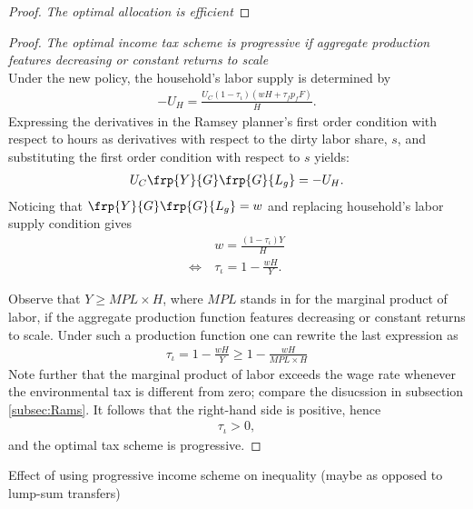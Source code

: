 \begin{proof}\textit{The optimal allocation is efficient}
\end{proof}

\begin{proof} \textit{The optimal income tax scheme is progressive if aggregate production features decreasing or constant returns to scale}\\
Under the new policy, the household's labor supply is determined by
\begin{align}
-U_H=\frac{U_C (1-\tau_{\iota})(wH+\tau_f p_fF)}{H}.
\end{align}
Expressing the derivatives in the Ramsey planner's first order condition with respect to hours as derivatives with respect to the dirty labor share, $s$, and substituting the first order condition with respect to $s$ yields:
\begin{align}
U_C \frp{Y}{G}\frp{G}{L_g}=-U_H.
\end{align}
Noticing that $\frp{Y}{G}\frp{G}{L_g}=w$ and replacing household's labor supply condition gives
\begin{align}
& w=\frac{(1-\tau_\iota)Y}{H}\\
\Leftrightarrow\ & \tau_\iota=1-\frac{wH}{Y}. 
\end{align} 


Observe that $Y\geq MPL \times H$, where $MPL$ stands in for the marginal product of labor, if the aggregate production function features decreasing or constant returns to scale. Under such a production function one can rewrite the last expression as
\begin{align}
\tau_{\iota}=1-\frac{wH}{Y}\geq 1-\frac{w H}{MPL \times H}
\end{align}
 Note further that the marginal product of labor exceeds the wage rate whenever the environmental tax is different from zero; compare the disucssion in subsection \ref{subsec:Rams}. It follows that the right-hand side is positive, hence
\begin{align}
\tau_{\iota}>0,
\end{align}
and the optimal tax scheme is progressive.
\end{proof}

\begin{prop}
Effect of using progressive income scheme on inequality (maybe as opposed to lump-sum transfers)
\end{prop}

